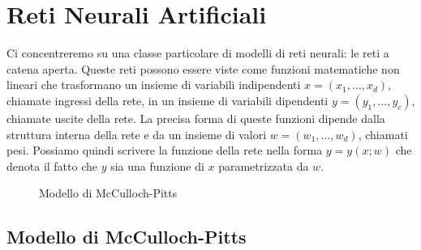 \documentclass[11pt,a4paper,twoside,
openright]{book}
\newcommand{\addsymbol}{\draw[thick] (0.5em,0.5em) -- (0,0.5em) -- 
                        (0,-0.5em) --  (-0.5em,-0.5em)
                        (0em,0.75em) -- (0em,-0.75em)
                        (0.75em,0em) -- (-0.75em,0em);}
\begin{document}
\section{Reti Neurali Artificiali}
\label{section:retiartificiali}
Ci concentreremo su una classe particolare di modelli di reti neurali: le reti a catena aperta. Queste reti possono essere viste come funzioni matematiche non lineari che trasformano un insieme di variabili indipendenti $x = (x_{1}, \dots , x_{d})$, chiamate ingressi della rete, in un insieme di variabili dipendenti $y = (y_{1}, \dots , y_{c})$, chiamate uscite della rete. La precisa forma di queste funzioni dipende dalla struttura interna della rete e da un insieme di valori $w = (w_{1}, \dots , w_{d})$, chiamati pesi. Possiamo quindi scrivere la funzione della rete nella forma $y = y(x; w)$ che denota il fatto che $y$ sia una funzione di $x$ parametrizzata da $w$.

\begin{figure}[h!]
\begin{center}
\end{center}
\caption{Modello di McCulloch-Pitts}
\label{fig:mcpitts}
\end{figure}
\subsection*{Modello di McCulloch-Pitts}
\end{document}
